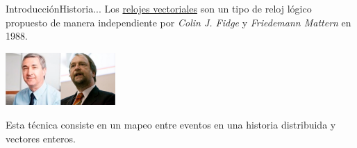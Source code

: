 \begin{frame}{Introducción}{Historia...}
	\justifying
        Los \underline{relojes vectoriales} son un tipo de
        reloj lógico propuesto de manera independiente por
        \textit{Colin J. Fidge} y \textit{Friedemann Mattern}
        en 1988.
        
        \begin{center}
          \includegraphics[height = 2cm]{./Imagenes/FidgeAndMattern.png}
        \end{center}
        
        Esta técnica consiste en un mapeo entre eventos en una
        historia distribuida y vectores enteros.
\end{frame}
